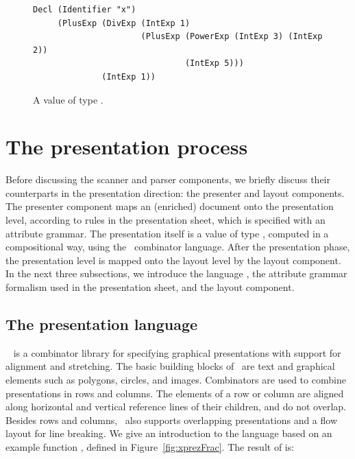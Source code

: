 \documentclass{article}[10pt]
\begin{document}
\begin{figure}
\begin{center}
\begin{footnotesize}
\begin{verbatim}
Decl (Identifier "x") 
     (PlusExp (DivExp (IntExp 1)
                      (PlusExp (PowerExp (IntExp 3) (IntExp 2))
                               (IntExp 5)))
              (IntExp 1))
\end{verbatim}
\end{footnotesize}
\end{center}
\caption{A value of type .} \label{fig:valueExample} 
\end{figure}







%
\section{The presentation process}\label{sect:presentationProcess}
%

Before discussing the scanner and parser components, we briefly discuss their counterparts in the presentation direction: the presenter and layout components. The presenter component maps an (enriched) document onto the presentation level, according to rules in the presentation sheet, which is specified with an attribute grammar. The presentation itself is a value of type , computed in a compositional way, using the\  combinator language. After the presentation phase, the presentation level is mapped onto the layout level by the layout component. In the next three subsections, we introduce the language \Xprez, the attribute grammar formalism used in the presentation sheet, and the layout component.

\subsection{The {\Xprez} presentation language} \label{sect:xprez}

\Xprez~\cite{schrage04Proxima} is a combinator library for specifying graphical presentations with support for alignment and stretching.  The basic building blocks of \Xprez\ are text and graphical elements such as polygons, circles, and images. Combinators are used to combine presentations in rows and columns. The elements of a row or column are aligned along horizontal and vertical reference lines of their children, and do not overlap. Besides rows and columns, \Xprez\ also supports overlapping presentations and a flow layout for line breaking. We give an introduction to the language based on an example function , defined in Figure~\ref{fig:xprezFrac}. The result of  is:
\end{document}
